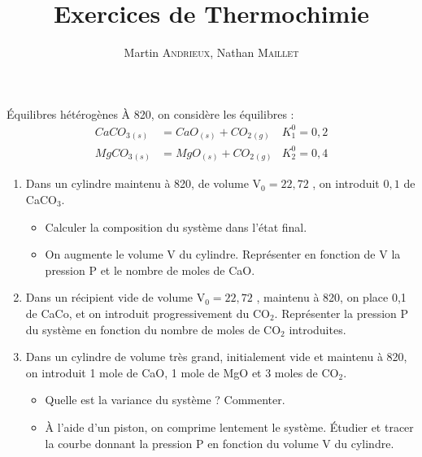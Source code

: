 \documentclass[french, a4paper, 11pt]{article}
\title{Exercices de Thermochimie}
\author{Martin \textsc{Andrieux}, Nathan \textsc{Maillet}}
\date{}
\newcommand{\s}{{}_{(s)}}
\newcommand{\g}{{}_{(g)}}
\begin{document}
\maketitle

\begin{cadre}{Équilibres hétérogènes}
  À 820\celsius, on considère les équilibres :
  \begin{align*}
    CaCO_3\s &= CaO\s + CO_2\g  &K^0_1=0,2 \\
    MgCO_3\s &= MgO\s + CO_2\g  &K^0_2=0,4
  \end{align*}
  \begin{enumerate}
    \item Dans un cylindre maintenu à 820\celsius, de volume V$_0=22,72$ \liter,
    on introduit $0,1$ \mole{} de CaCO$_3$.
      \begin{itemize}
        \item Calculer la composition du système dans l'état final.
        \item On augmente le volume V du cylindre. Représenter en fonction de V la pression P et le nombre de moles de CaO.
      \end{itemize}
    \item Dans un récipient vide de volume V$_0=22,72$ \liter, maintenu à 820\celsius,
    on place 0,1 \mole de CaCo, et on introduit progressivement du CO$_2$. Représenter la pression P 
    du système en fonction du nombre de moles de CO$_2$ introduites.
    \item Dans un cylindre de volume très grand, initialement vide et maintenu à 820\celsius,
    on introduit 1 mole de CaO, 1 mole de MgO et 3 moles de CO$_2$.
      \begin{itemize}
        \item Quelle est la variance du système ? Commenter.
        \item À l'aide d'un piston, on comprime lentement le système.
        Étudier et tracer la courbe donnant la pression P en fonction du volume V du cylindre.
      \end{itemize}
  \end{enumerate}

\end{cadre}
\end{document}
